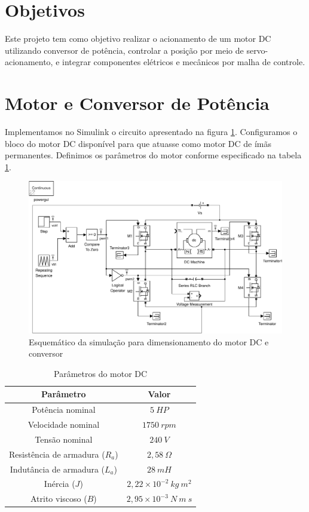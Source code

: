 \documentclass{article}
\begin{document}


\onehalfspacing
\section{Objetivos}
	Este projeto tem como objetivo realizar o acionamento de um motor DC utilizando conversor de potência, controlar a posição por meio de servo-acionamento, e integrar componentes elétricos e mecânicos por malha de controle. 

\section{Motor e Conversor de Potência}
Implementamos no Simulink o circuito apresentado na figura \ref{fig:sim1}. Configuramos o bloco do motor DC disponível para que atuasse como motor DC de ímãs permanentes. Definimos os parâmetros do motor conforme especificado na tabela \ref{tab:param}.

\begin{figure}[H]
	\centering
	\includegraphics[width=\linewidth]{matlab/sim1}
	\caption{Esquemático da simulação para dimensionamento do motor DC e conversor}
	\label{fig:sim1}
\end{figure}

\begin{table}[]
	\centering
	\caption{Parâmetros do motor DC}
	\label{tab:param}
	\begin{tabular}{|c|c|}
		\hline
		\textbf{Parâmetro}              & \textbf{Valor}                 \\ \hline
		Potência nominal                & $5\ HP$                        \\ \hline
		Velocidade nominal              & $1750\ rpm$                    \\ \hline
		Tensão nominal                  & $240\ V$                       \\ \hline
		Resistência de armadura ($R_a$) & $2,58\ \Omega$                 \\ \hline
		Indutância de armadura ($L_a$)  & $28\ mH$                       \\ \hline
		Inércia ($J$)                   & $2,22 \times 10^{-2}\ kg\ m^2$ \\ \hline
		Atrito viscoso ($B$)            & $2,95 \times 10^{-3}\ N\ m\ s$ \\ \hline
	\end{tabular}
\end{table}
\end{document}
